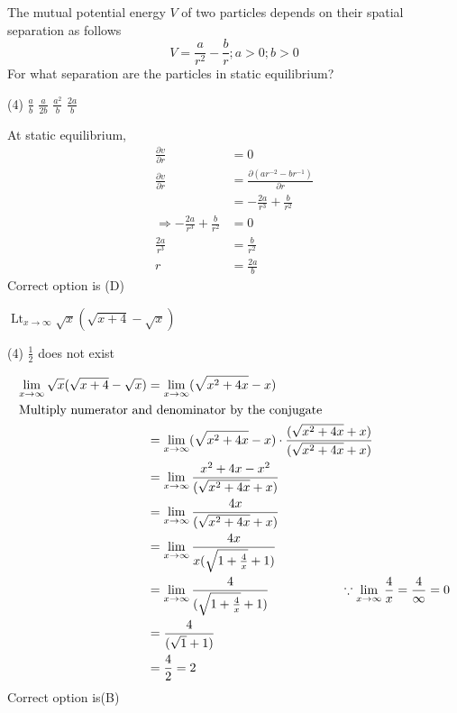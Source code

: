 \begin{questions}
	\begin{minipage}{\textwidth}
		\question The mutual potential energy $V$ of two particles depends on their spatial separation as follows $$V=\frac{a}{r^{2}}-\frac{b}{r} ; a>0 ; b>0$$For what separation are the particles in static equilibrium?
	\end{minipage}
	\begin{tasks}(4)
		\task[\textbf{A.}] $\frac{a}{b}$
		\task[\textbf{B.}]$\frac{a}{2 b}$
		\task[\textbf{C.}] $\frac{a^{2}}{b}$
		\task[\textbf{D.}] $\frac{2 a}{b}$ 
	\end{tasks}
	\begin{answer}
		At static equilibrium,\begin{align*}
		\frac{\partial v}{\partial r}&=0\\
		\frac{\partial v}{\partial r}&=\frac{\partial( ar^{-2}-br^{-1})}{\partial r }\\
		&=-\frac{2a}{r^{3}}+\frac{b}{r^{2}}\\
		\Rightarrow -\frac{2a}{r^{3}}+\frac{b}{r^{2}}&=0\\
		\frac{2a}{r^{3}}&=\frac{b}{r^{2}}\\
		r&=\frac{2a}{b}
		\end{align*}
		Correct option is (D)
	\end{answer}
	\begin{minipage}{\textwidth}
		\question $\operatorname{Lt}_{x \rightarrow \infty} \sqrt{x}(\sqrt{x+4}-\sqrt{x})$
	\end{minipage}
	\begin{tasks}(4)
		\task[\textbf{C.}] $\frac{1}{2}$
		\task[\textbf{D.}] does not exist
	\end{tasks}
	\begin{answer}
		\begin{align*}
		\lim _{x \rightarrow \infty} \sqrt{x}(\sqrt{x+4}-\sqrt{x})&=\lim _{x \rightarrow \infty} (\sqrt{x^{2}+4x}-{x})\\
		\intertext{Multiply numerator and denominator by the conjugate}
		&=\lim _{x \rightarrow \infty} (\sqrt{x^{2}+4x}-{x})\cdot \frac{(\sqrt{x^{2}+4x}+{x})}{(\sqrt{x^{2}+4x}+{x})}\\
		&=\lim _{x \rightarrow \infty} \frac{x^{2}+4x-x^{2}}{(\sqrt{x^{2}+4x}+{x})}\\
		&=\lim _{x \rightarrow \infty} \frac{4x}{(\sqrt{x^{2}+4x}+{x})}\\
		&=\lim _{x \rightarrow \infty} \frac{4x}{x(\sqrt{1+\frac{4}{x}}+{1})}\\
		&=\lim _{x \rightarrow \infty} \frac{4}{(\sqrt{1+\frac{4}{x}}+{1})} \hspace{2cm} \because \lim _{x \rightarrow \infty}\frac{4}{x}=\frac{4}{\infty}=0 \\
		&=\frac{4}{(\sqrt{1}+{1})}\\
		&=\frac{4}{2}=2
		\end{align*}
		Correct option is(B)
	\end{answer}
	

\end{questions}
